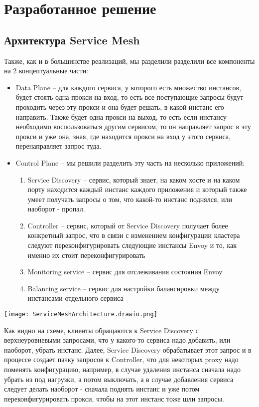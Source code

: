 
\section{Разработанное решение}

\subsection{Архитектура Service Mesh}
Также, как и в большинстве реализаций, мы разделили разделили все компоненты на 2 концептуальные части:
\begin{itemize}
	\item Data Plane -- для каждого сервиса, у которого есть множество инстансов, будет стоять одна прокси на вход, то есть все поступающие запросы будут проходить через эту прокси и она будет решать, в какой инстанс его направить. Также будет одна прокси на выход, то есть если инстансу необходимо воспользоваться другим сервисом, то он направляет запрос в эту прокси и уже она, зная, где находится прокси на вход у этого сервиса, перенаправляет запрос туда.
	\item Control Plane -- мы решили разделить эту часть на несколько приложений:
\begin{enumerate}
	\item Service Discovery -- сервис, который знает, на каком хосте и на каком порту находится каждый инстанс каждого приложения и который также умеет получать запросы о том, что какой-то инстанс поднялся, или наоборот - пропал.
	\item Controller -- сервис, который от Service Discovery получает более конкретный запрос, что в связи с изменением конфигурации кластера следуют переконфигурировать следующие инстансы Envoy и то, как именно их стоит переконфигурировать
	\item Monitoring service -- сервис для отслеживания состояния Envoy
	\item Balancing service -- сервис для настройки балансировки между инстансами отдельного сервиса
\end{enumerate}
\end{itemize}

\texttt{[image: ServiceMeshArchitecture.drawio.png]}

Как видно на схеме, клиенты обращаются к Service Discovery с верхнеуровневыми запросами, что у какого-то сервиса надо добавить, или наоборот, убрать инстанс. Далее, Service Discovery обрабатывает этот запрос и в процессе создает пачку запросов к Controller, что для некоторых proxy надо поменять конфигурацию, например, в случае удаления инстанса сначала надо убрать из под нагрузки, а потом выключать, а в случае добавления сервиса следует делать наоборот - сначала поднять инстанс и уже потом переконфигурировать прокси, чтобы на этот инстанс тоже шли запросы.

